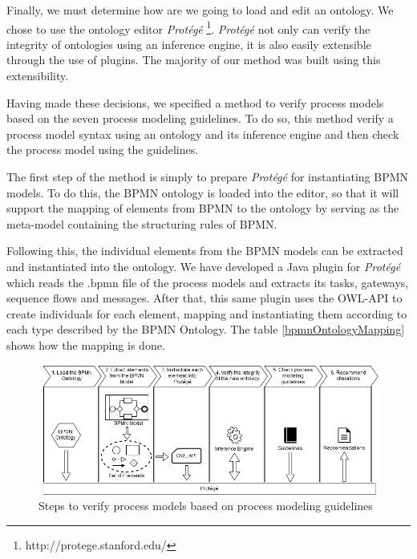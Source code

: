 \documentclass[a4paper,twoside]{article}
\begin{document}
Finally, we must determine how are we going to load and edit an ontology. We chose to use the ontology editor \textit{Protégé} \footnote{http://protege.stanford.edu/}. \textit{Protégé} not only can verify the integrity of ontologies using an inference engine, it is also easily extensible through the use of plugins. The majority of our method was built using this extensibility. %

\noindent Having made these decisions, we specified a method to verify process models based on the seven process modeling guidelines. To do so, this method verify a process model syntax using an ontology and its inference engine and then check the process model using the guidelines.

The first step of the method is simply to prepare \textit{Protégé} for instantiating BPMN models. To do this, the BPMN ontology is loaded into the editor, so that it will support the mapping of elements from BPMN to the ontology by serving as the meta-model containing the structuring rules of BPMN.

Following this, the individual elements from the BPMN models can be extracted and instantiated into the ontology. We have developed a Java plugin for \textit{Protégé} which reads the .bpmn file of the process models and extracts its tasks, gateways, sequence flows and messages. After that, this same plugin uses the OWL-API to create individuals for each element, mapping and instantiating them according to each type described by the BPMN Ontology. The table \ref{bpmnOntologyMapping} shows how the mapping is done.

\begin{figure}
	\includegraphics[width=\textwidth ]{method.png}
	\caption{Steps to verify process models based on process modeling guidelines}
	\label{methodFigure}
\end{figure}
\end{document}
